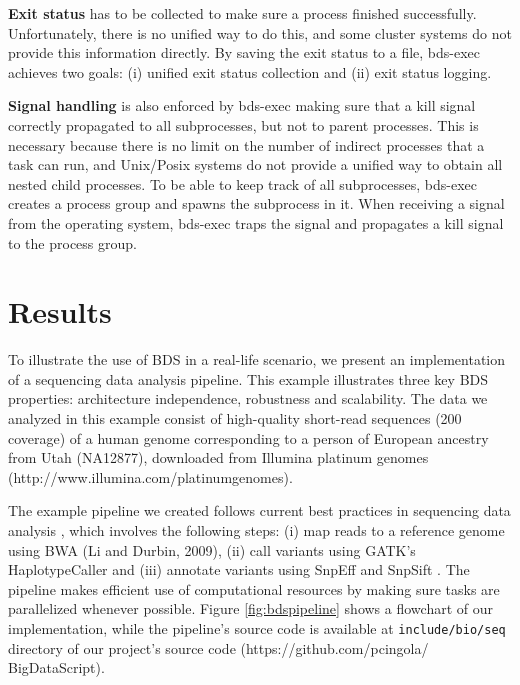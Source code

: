\textbf{Exit status} has to be collected to make sure a process finished successfully. Unfortunately, there is no unified way to do this, and some cluster systems do not provide this information directly. By saving the exit status to a file, bds-exec achieves two goals: (i) unified exit status collection and (ii) exit status logging.

\textbf{Signal handling} is also enforced by bds-exec making sure that a kill signal correctly propagated to all subprocesses, but not to parent processes. This is necessary because there is no limit on the number of indirect processes that a task can run, and Unix/Posix systems do not provide a unified way to obtain all nested child processes. To be able to keep track of all subprocesses, bds-exec creates a process group and spawns the subprocess in it. When receiving a signal from the operating system, bds-exec traps the signal and propagates a kill signal to the process group.


\section{Results}

To illustrate the use of BDS in a real-life scenario, we present an implementation of a sequencing data analysis pipeline. This example illustrates three key BDS properties: architecture independence, robustness and scalability. The data we analyzed in this example consist of high-quality short-read sequences (200 coverage) of a human genome corresponding to a person of European ancestry from Utah (NA12877), downloaded from Illumina platinum genomes (http://www.illumina.com/platinumgenomes).

The example pipeline we created follows current best practices in sequencing data analysis \cite{mckenna2010genome}, which involves the following steps: (i) map reads to a reference genome using BWA (Li and Durbin, 2009), (ii) call variants using GATK’s HaplotypeCaller and (iii) annotate variants using SnpEff \cite{cingolani2012program} and SnpSift \cite{cingolani2012using}. The pipeline makes efficient use of computational resources by making sure tasks are parallelized whenever possible. Figure \ref{fig:bdspipeline} shows a flowchart of our implementation, while the pipeline’s source code is available at \texttt{include/bio/seq} directory of our project’s source code (https://github.com/pcingola/ BigDataScript).

